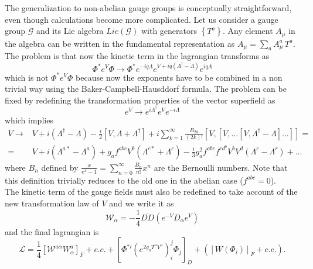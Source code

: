\documentclass[12pt]{article}
\begin{document}
The generalization to non-abelian gauge groups is conceptually straightforward, even though calculations become more complicated. Let us consider a gauge group $\mathcal{G}$ and its Lie algebra $Lie(\mathcal{G})$ with generators $\left\{T^a\right\}$.
Any element $A_\mu$ in the algebra can be written in the fundamental representation as $A_\mu = \sum_a A_\mu^a \, T^a$. The problem is that now the kinetic term in the lagrangian transforms as 
\begin{equation*}
  \Phi^* e^V \Phi \to \Phi^* e^{-iq\Lambda} e^{V + iq(\Lambda^\dagger - \Lambda)} e^{iq\Lambda}
\end{equation*}
which is not $\Phi^* e^V \Phi$ because now the exponents have to be combined in a non trivial way using the Baker-Campbell-Hausddorf formula. The problem can be fixed by redefining the transformation properties of the vector superfield as 
\begin{equation*}
  e^V \to e^{i\Lambda^\dagger} e^V e^{-i\Lambda}
\end{equation*}
which implies 
\begin{align*}
  V \rightarrow &V + i\left(\Lambda^{\dagger}-\Lambda\right)-\frac{i}{2}\left[V, \Lambda+\Lambda^{\dagger}\right] 
  + i \sum_{k=1}^{\infty} \frac{B_{2 k}}{(2 k) !}\left[V,\left[V, \ldots\left[V, \Lambda^{\dagger}-\Lambda\right] \ldots\right]\right] = \\
  = & V + i\left(\Lambda^{a *}-\Lambda^{a}\right)+g_{a} f^{a b c} V^{b}\left(\Lambda^{c *}+\Lambda^{c}\right) 
  -\frac{i}{3} g_{a}^{2} f^{a b c} f^{c d^{b}} V^{b} V^{d}\left(\Lambda^{c}-\Lambda^{r}\right)+\ldots
\end{align*}
where $B_n$ defined by $\frac{x}{e^{x}-1}=\sum_{n=0}^{\infty} \frac{B_{n}}{n !} x^{n}$ are the Bernoulli numbers. Note that this definition trivially reduces to the old one in the abelian case ($f^{abc}=0$). \\
The kinetic term of the gauge fields must also be redefined to take account of the new transformation law of $V$ and we write it as 
\begin{equation*}
  \mathcal{W}_\alpha = -\frac{1}{4} \overline{DD} (e^{-V}D_{\alpha}e^V)
\end{equation*}
and the final lagrangian is 
\begin{equation*}
  \mathcal{L}=\frac{1}{4}\left[\mathcal{W}^{a \alpha} W_{\alpha}^{a}\right]_{F}+c . c .+\left[\Phi^{*i}\left(e^{2 g_a T^{a} V^{a}}\right)_{i}^j \Phi_{j}\right]_{D}+\left(\left[W\left(\Phi_{i}\right)\right]_F+c . c .\right) .
\end{equation*}
\end{document}
